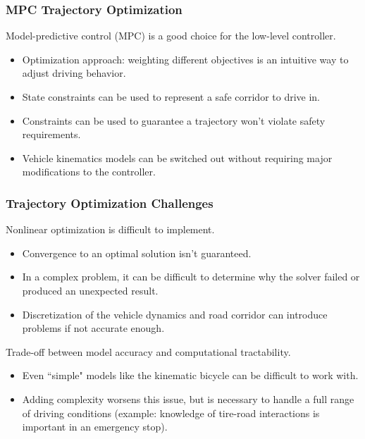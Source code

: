 \documentclass{beamer}
\begin{document}
\begin{frame}
\frametitle{MPC Trajectory Optimization}
Model-predictive control (MPC) is a good choice for the low-level controller.
\begin{itemize}
\item Optimization approach: weighting different objectives is an intuitive way to adjust driving behavior.
\item State constraints can be used to represent a safe corridor to drive in.
\item Constraints can be used to guarantee a trajectory won't violate safety requirements.
\item Vehicle kinematics models can be switched out without requiring major modifications to the controller.
\end{itemize}
\end{frame}

\begin{frame}
\frametitle{Trajectory Optimization Challenges}
Nonlinear optimization is difficult to implement.
\begin{itemize}
	\item Convergence to an optimal solution isn't guaranteed.
	\item In a complex problem, it can be difficult to determine why the solver failed or produced an unexpected result.
	\item Discretization of the vehicle dynamics and road corridor can introduce problems if not accurate enough.
\end{itemize}

Trade-off between model accuracy and computational tractability.
\begin{itemize}
	\item Even ``simple" models like the kinematic bicycle can be difficult to work with.
	\item Adding complexity worsens this issue, but is necessary to handle a full range of driving conditions (example: knowledge of tire-road interactions is important in an emergency stop).
\end{itemize}
\end{frame}
\end{document}
